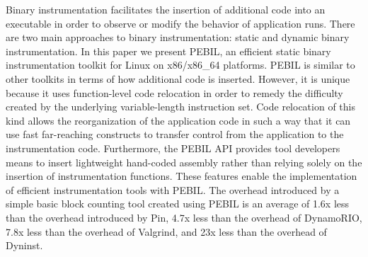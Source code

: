 \begin{it}

Binary instrumentation facilitates the insertion of additional code into an
executable in order to observe or modify the behavior of application runs. There
are two main approaches to binary instrumentation: static and dynamic binary
instrumentation. In this paper we present PEBIL, an efficient static binary
instrumentation toolkit for Linux on x86/x86\_64 platforms. PEBIL is similar to
other toolkits in terms of how additional code is inserted. However, it is
unique because it uses function-level code relocation in order to remedy the
difficulty created by the underlying variable-length instruction set. Code
relocation of this kind allows the reorganization of the application code in
such a way that it can use fast far-reaching constructs to transfer control from
the application to the instrumentation code. Furthermore, the PEBIL API provides
tool developers means to insert lightweight hand-coded assembly rather than
relying solely on the insertion of instrumentation functions. These features
enable the implementation of efficient instrumentation tools with PEBIL. The
overhead introduced by a simple basic block counting tool created using PEBIL is
an average of 1.6x less than the overhead introduced by Pin, 4.7x less than the
overhead of DynamoRIO, 7.8x less than the overhead of Valgrind, and 23x less
than the overhead of Dyninst.

\end{it}
